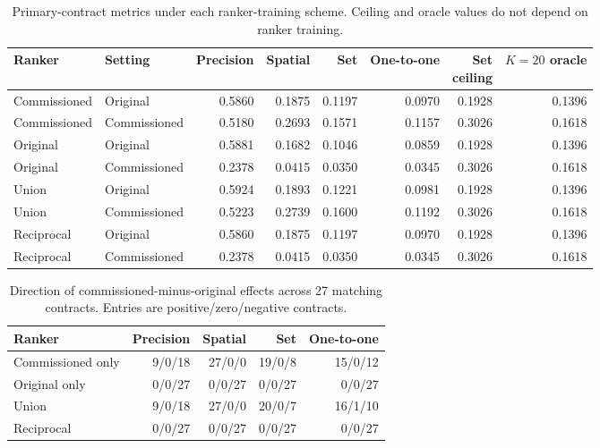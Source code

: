 \documentclass[preprint,12pt]{elsarticle}
\begin{document}
\begin{table}[htbp]
\centering
\caption{Primary-contract metrics under each ranker-training scheme. Ceiling and oracle values do not depend on ranker training.}
\label{tab:s5primary}
\footnotesize
\setlength{\tabcolsep}{3.5pt}
\begin{tabular}{llrrrrrr}
\toprule
Ranker & Setting & Precision & Spatial & Set & One-to-one & \shortstack{Set\\ceiling} & \shortstack{$K=20$\\oracle} \\
\midrule
Commissioned & Original & 0.5860 & 0.1875 & 0.1197 & 0.0970 & 0.1928 & 0.1396 \\
Commissioned & Commissioned & 0.5180 & 0.2693 & 0.1571 & 0.1157 & 0.3026 & 0.1618 \\
Original & Original & 0.5881 & 0.1682 & 0.1046 & 0.0859 & 0.1928 & 0.1396 \\
Original & Commissioned & 0.2378 & 0.0415 & 0.0350 & 0.0345 & 0.3026 & 0.1618 \\
Union & Original & 0.5924 & 0.1893 & 0.1221 & 0.0981 & 0.1928 & 0.1396 \\
Union & Commissioned & 0.5223 & 0.2739 & 0.1600 & 0.1192 & 0.3026 & 0.1618 \\
Reciprocal & Original & 0.5860 & 0.1875 & 0.1197 & 0.0970 & 0.1928 & 0.1396 \\
Reciprocal & Commissioned & 0.2378 & 0.0415 & 0.0350 & 0.0345 & 0.3026 & 0.1618 \\
\bottomrule
\end{tabular}
\end{table}

\begin{table}[htbp]
\centering
\caption{Direction of commissioned-minus-original effects across 27 matching contracts. Entries are positive/zero/negative contracts.}
\label{tab:s5signs}
\small
\begin{tabular}{lrrrr}
\toprule
Ranker & Precision & Spatial & Set & One-to-one \\
\midrule
Commissioned only & 9/0/18 & 27/0/0 & 19/0/8 & 15/0/12 \\
Original only & 0/0/27 & 0/0/27 & 0/0/27 & 0/0/27 \\
Union & 9/0/18 & 27/0/0 & 20/0/7 & 16/1/10 \\
Reciprocal & 0/0/27 & 0/0/27 & 0/0/27 & 0/0/27 \\
\bottomrule
\end{tabular}
\end{table}
\end{document}
